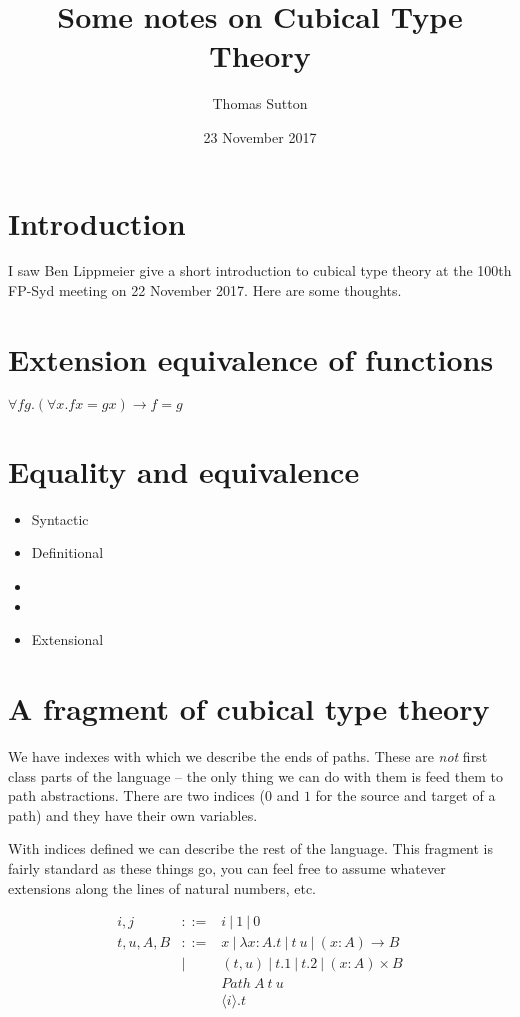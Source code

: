 \documentclass[a4paper]{article}
\title{Some notes on Cubical Type Theory}
\author{Thomas Sutton}
\date{23 November 2017}
\newcommand{\fun}[3]{(#1 : #2) \rightarrow #3}
\newcommand{\labs}[3]{\lambda #1 : #2. #3}
\newcommand{\lapp}[2]{#1 \: #2}
\newcommand{\pair}[2]{(#1 , #2)}
\newcommand{\lprj}[1]{#1.1}
\newcommand{\rprj}[1]{#1.2}
\newcommand{\dprod}[3]{(#1 : #2) \times #3}
\newcommand{\pabs}[2]{{\langle #1 \rangle}.{#2}}
\newcommand{\Path}[3]{{Path\:{#1}\:{#2}\:{#3}}}
\newcommand{\alt}{\: | \:}
\begin{document}
\maketitle

\section{Introduction}
I saw Ben Lippmeier give a short introduction to cubical type
theory\cite{DBLP:journals/corr/CohenCHM16} at the 100th FP-Syd meeting on 22 November
2017. Here are some thoughts.

\section{Extension equivalence of functions}

$\forall f g. (\forall x. f x = g x) \rightarrow f = g$

\section{Equality and equivalence}

\begin{itemize}
\item Syntactic
\item Definitional
\item
\item
\item Extensional
\end{itemize}

\section{A fragment of cubical type theory}

We have indexes with which we describe the ends of paths. These are
{\em not} first class parts of the language -- the only thing we can
do with them is feed them to path abstractions. There are two indices
($0$ and $1$ for the source and target of a path) and they have their
own variables.

With indices defined we can describe the rest of the language. This
fragment is fairly standard as these things go, you can feel free to
assume whatever extensions along the lines of natural numbers, etc.

\begin{align*}
  i,j     &::=&i \alt 1 \alt 0\\
  t,u,A,B &::=&x \alt \labs{x}{A}{t} \alt \lapp{t}{u} \alt \fun{x}{A}{B}\\
          &|  &\pair{t}{u} \alt \lprj{t} \alt \rprj{t} \alt \dprod{x}{A}{B} \\
          &   &\Path{A}{t}{u}\\
          &   &\pabs{i}{t}\\
\end{align*}
\end{document}
